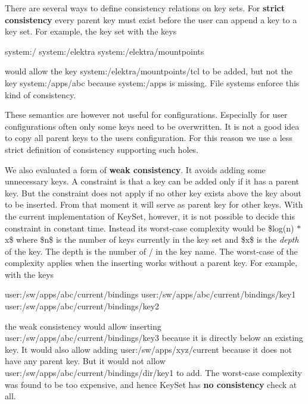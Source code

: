 There are several ways to define consistency relations on key sets. For {\bfseries strict consistency} every parent key must exist before the user can append a key to a key set. For example, the key set with the keys


\begin{DoxyCode}
system:/
system:/elektra
system:/elektra/mountpoints
\end{DoxyCode}


would allow the key {\ttfamily system\+:/elektra/mountpoints/tcl} to be added, but not the key {\ttfamily system\+:/apps/abc} because {\ttfamily system\+:/apps} is missing. File systems enforce this kind of consistency.

These semantics are however not useful for configurations. Especially for user configurations often only some keys need to be overwritten. It is not a good idea to copy all parent keys to the users configuration. For this reason we use a less strict definition of consistency supporting such holes.

We also evaluated a form of {\bfseries weak consistency}. It avoids adding some unnecessary keys. A constraint is that a key can be added only if it has a parent key. But the constraint does not apply if no other key exists above the key about to be inserted. From that moment it will serve as parent key for other keys. With the current implementation of {\ttfamily Key\+Set}, however, it is not possible to decide this constraint in constant time. Instead its worst-\/case complexity would be \$log(n) $\ast$ x\$ where \$n\$ is the number of keys currently in the key set and \$x\$ is the {\itshape depth} of the key. The depth is the number of {\ttfamily /} in the key name. The worst-\/case of the complexity applies when the inserting works without a parent key. For example, with the keys


\begin{DoxyCode}
user:/sw/apps/abc/current/bindings
user:/sw/apps/abc/current/bindings/key1
user:/sw/apps/abc/current/bindings/key2
\end{DoxyCode}


the weak consistency would allow inserting {\ttfamily user\+:/sw/apps/abc/current/bindings/key3} because it is directly below an existing key. It would also allow adding {\ttfamily user\+:/sw/apps/xyz/current} because it does not have any parent key. But it would not allow {\ttfamily user\+:/sw/apps/abc/current/bindings/dir/key1} to add. The worst-\/case complexity was found to be too expensive, and hence {\ttfamily Key\+Set} has {\bfseries no consistency} check at all.

